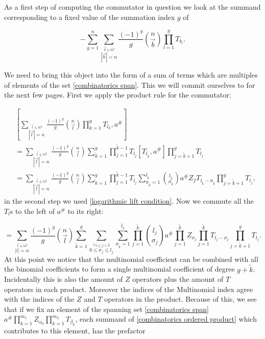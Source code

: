 \documentclass[b5paper,draft,openbib,12pt]{memoir}
\begin{document}
As a first step of computing the commutator in question we look at the summand
corresponding to a fixed value of the summation index \(g\) of 

\begin{equation}\label{combinatorics total sum of T}
-\sum_{g=1}^n \sum_{\stackrel{\vec{b}\in\mathbb{N}^g}{|\vec{b}|=n}}\frac{(-1)^g}{g} 
\binom{n}{\vec{b}} \prod_{l=1}^g T_{b_l}.
\end{equation}

 We need to bring this object into the form of a sum
of terms which are multiples of elements of the set \eqref{combinatorics span}.
This we will commit ourselves to for the next few pages. First we apply
the product rule for the commutator:

\begin{align*}
&\left[ \sum_{\stackrel{\vec{l}\in\mathbb{N}^g}{|\vec{l}|=n}} \frac{(-1)^g}{g} \binom{n}{\vec{l}}
 \prod_{k=1}^g T_{l_k},a^\#\right]\\
 &= \sum_{\stackrel{\vec{l}\in\mathbb{N}^g}{|\vec{l}|=n}} \frac{(-1)^g}{g} \binom{n}{\vec{l}}
 \sum_{\tilde{k}=1}^g \prod_{j=1}^{\tilde{k}-1} T_{l_j} 
 \left[ T_{l_{\tilde{k}}},a^\#\right] \prod_{j=\tilde{k}+1}^g T_{l_j}\\
&=\sum_{\stackrel{\vec{l}\in\mathbb{N}^g}{|\vec{l}|=n}} \frac{(-1)^g}{g} \binom{n}{\vec{l}}
 \sum_{\tilde{k}=1}^g \prod_{j=1}^{\tilde{k}-1} T_{l_j} 
\sum_{\sigma_{\tilde{k}}=1}^{l_{\tilde{k}}} \binom{l_{\tilde{k}}}{\sigma_{\tilde{k}}} 
a^\# Z_f T_{l_{\tilde{k}}-\sigma_{\tilde{k}}} \prod_{j=\tilde{k}+1}^g T_{l_j},
\end{align*}
in the second step we used \eqref{logarithmic lift condition}. Now we commute
all the \(T_l\)s to the left of \(a^\#\) to its right:

\begin{equation}\label{combinatorics ordered product}
= \sum_{\stackrel{\vec{l}\in\mathbb{N}^g}{|l|=n}} \frac{(-1)^g}{g} \binom{n}{\vec{l}}
\sum_{\tilde{k}=1}^g \sum_{\stackrel{\forall 1\le j <\tilde{k}}{0\le \sigma_{j}\le l_j}}
\sum_{\sigma_{\tilde{k}}=1}^{l_{\tilde{k}}} \prod_{j=1}^{\tilde{k}} \binom{l_j}{\sigma_j}
a^\# \prod_{j=1}^{\tilde{k}} Z_{\sigma_j} \prod_{j=1}^{\tilde{k}} T_{l_j-\sigma_j}
\prod_{j=\tilde{k}+1}^g T_{l_j}.
\end{equation}
At this point we notice that the multinomial coefficient can be combined with all
the binomial coefficients to form a single multinomial coefficient of degree
\(g+\tilde{k}\). Incidentally this is also the amount of \(Z\) operators plus the amount
of \(T\) operators in each product. Moreover the indices of the Multinomial index
agree with the indices of the \(Z\) and \(T\) operators in the product. Because of 
this, we see that if we fix an element of the spanning set \eqref{combinatorics span}
\(a^\# \prod_{k=1}^{m_1} Z_{\alpha_k} \prod_{k=1}^{m_2}T_{\beta_k}\), each 
summand of \eqref{combinatorics ordered product} which contributes to
this element, has the prefactor
\end{document}
